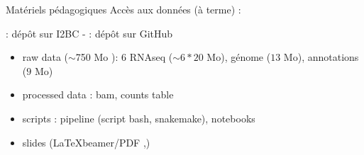 \documentclass{beamer}
\begin{document}
\begin{frame}{Matériels pédagogiques}
Accès aux données (à terme) : 
\begin{center}
    \logoIdeuxBC : dépôt sur I2BC - \logoGithub : dépôt sur GitHub
\end{center}
\begin{itemize}
  \item raw data ($\sim$750 Mo \logoIdeuxBC): 6 RNAseq ($\sim 6*20$ Mo), génome ($13$ Mo), annotations ($9$ Mo)
  \item processed data \logoIdeuxBC: bam, counts table
  \item scripts \logoGithub: pipeline (script bash, snakemake), notebooks
  \item slides (\LaTeX beamer/PDF \logoGithub,\logoIdeuxBC)
\end{itemize}
\end{frame}
\end{document}
